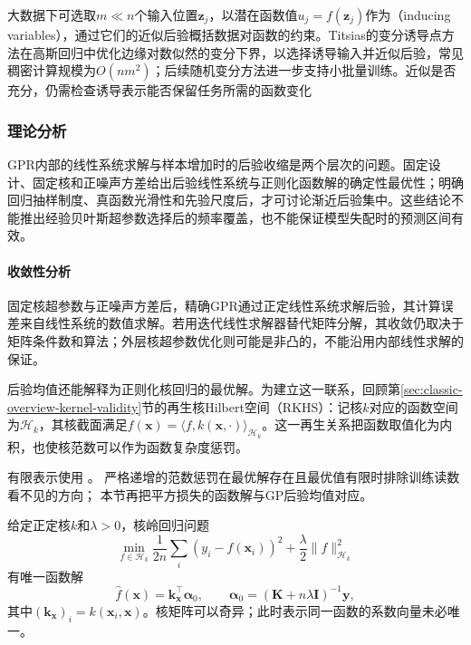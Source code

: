 大数据下可选取$m\ll n$个输入位置$\bm{z}_j$，以潜在函数值$u_j=f(\bm{z}_j)$作为（inducing variables），通过它们的近似后验概括数据对函数的约束。Titsias的变分诱导点方法在高斯回归中优化边缘对数似然的变分下界，以选择诱导输入并近似后验，常见稠密计算规模为$O(nm^2)$；后续随机变分方法进一步支持小批量训练。近似是否充分，仍需检查诱导表示能否保留任务所需的函数变化

\subsubsection{理论分析}
\label{sec:regression-gpr-theory}

GPR内部的线性系统求解与样本增加时的后验收缩是两个层次的问题。固定设计、固定核和正噪声方差给出后验线性系统与正则化函数解的确定性最优性；明确回归抽样制度、真函数光滑性和先验尺度后，才可讨论渐近后验集中。这些结论不能推出经验贝叶斯超参数选择后的频率覆盖，也不能保证模型失配时的预测区间有效。

\paragraph{收敛性分析}
固定核超参数与正噪声方差后，精确GPR通过正定线性系统求解后验，其计算误差来自线性系统的数值求解。若用迭代线性求解器替代矩阵分解，其收敛仍取决于矩阵条件数和算法；外层核超参数优化则可能是非凸的，不能沿用内部线性求解的保证。

后验均值还能解释为正则化核回归的最优解。为建立这一联系，回顾第\ref{sec:classic-overview-kernel-validity}节的再生核Hilbert空间（RKHS）：记核$k$对应的函数空间为$\mathcal H_k$，其核截面满足$f(\bm{x})=\langle f,k(\bm{x},\cdot)\rangle_{\mathcal H_k}$。这一再生关系把函数取值化为内积，也使核范数可以作为函数复杂度惩罚。

有限表示使用
。
严格递增的范数惩罚在最优解存在且最优值有限时排除训练读数看不见的方向；
本节再把平方损失的函数解与GP后验均值对应。

\begin{theorem}[表示定理与核岭回归解]
  \label{thm:regression-krr}
  给定正定核$k$和$\lambda>0$，核岭回归问题
  \[
    \min_{f\in\mathcal H_k}
      \frac1{2n}\sum_i(y_i-f(\bm{x}_i))^2
       +\frac{\lambda}{2}\lVert f\rVert_{\mathcal H_k}^2
  \]
  有唯一函数解
  \[
    \widehat f(\bm{x})=\bm{k}_{\bm{x}}^{\top}\bm{\alpha}_0,\qquad
    \bm{\alpha}_0=(\bm{K}+n\lambda\bm{I})^{-1}\bm{y},
  \]
  其中$(\bm{k}_{\bm{x}})_i=k(\bm{x}_i,\bm{x})$。核矩阵可以奇异；此时表示同一函数的系数向量未必唯一。
\end{theorem}

